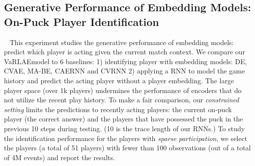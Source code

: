 \documentclass{article}
\newcommand{\system}{VaRLAE\;}
\begin{document}
\subsection{Generative Performance of Embedding Models: On-Puck Player Identification}~\label{subsec:identify-player}
This experiment studies the generative performance of embedding models: predict which player is acting given the current match context.
We compare our \system model to 6 baselines: 1) identifying player with embedding models: DE, CVAE, MA-BE, CAERNN and CVRNN 2) applying a RNN to model the game history and predict the acting player without a player embedding. The large player space (over 1k players) undermines the performance of encoders that do not utilize the recent play history. To make a fair comparison, our {\it constrained setting} limits the predictions to %
recently acting players: the current on-puck player (the correct answer) and the players that have possessed the puck in the previous 10  steps during testing. (10 is the trace length of our RNNs.)
To study the identification performance for the players with {\it sparse participation}, we select the players (a total of 51 players) with fewer than 100 observations (out of a total of 4M events) and report the results.
\end{document}

